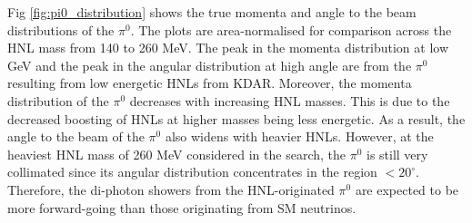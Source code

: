 Fig \ref{fig:pi0_distribution} shows the true momenta and angle to the beam distributions of the $\pi^0$.
The plots are area-normalised for comparison across the HNL mass from 140 to 260 MeV. 
The peak in the momenta distribution at low GeV and the peak in the angular distribution at high angle are from the $\pi^0$ resulting from low energetic HNLs from KDAR.
Moreover, the momenta distribution of the $\pi^0$ decreases with increasing HNL masses.
This is due to the decreased boosting of HNLs at higher masses being less energetic.
As a result, the angle to the beam of the $\pi^0$ also widens with heavier HNLs.
However, at the heaviest HNL mass of 260 MeV considered in the search, the $\pi^0$ is still very collimated since its angular distribution concentrates in the region $< 20^\circ$. 
Therefore, the di-photon showers from the HNL-originated $\pi^0$ are expected to be more forward-going than those originating from SM neutrinos.

